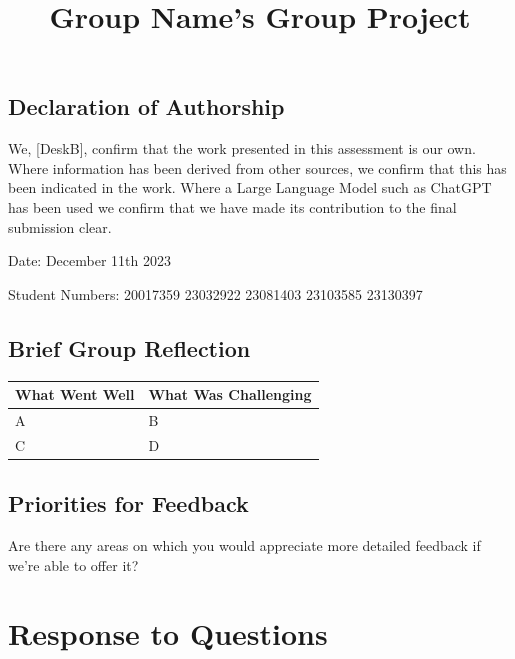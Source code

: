 \documentclass[
  a4paper,
  DIV=11,
  numbers=noendperiod]{scrartcl}
\title{Group Name's Group Project}
\author{}
\date{}
\begin{document}
\maketitle
\ifdefined\Shaded\renewenvironment{Shaded}{\begin{tcolorbox}[frame hidden, interior hidden, borderline west={3pt}{0pt}{shadecolor}, boxrule=0pt, enhanced, breakable, sharp corners]}{\end{tcolorbox}}\fi

\hypertarget{declaration-of-authorship}{%
\subsection*{Declaration of
Authorship}\label{declaration-of-authorship}}

We, {[}DeskB{]}, confirm that the work presented in this assessment is
our own. Where information has been derived from other sources, we
confirm that this has been indicated in the work. Where a Large Language
Model such as ChatGPT has been used we confirm that we have made its
contribution to the final submission clear.

Date: December 11th 2023

Student Numbers: 20017359 23032922 23081403 23103585 23130397

\hypertarget{brief-group-reflection}{%
\subsection{Brief Group Reflection}\label{brief-group-reflection}}

\begin{longtable}[]{@{}ll@{}}
\toprule\noalign{}
What Went Well & What Was Challenging \\
\midrule\noalign{}
\endhead
\bottomrule\noalign{}
\endlastfoot
A & B \\
C & D \\
\end{longtable}

\hypertarget{priorities-for-feedback}{%
\subsection{Priorities for Feedback}\label{priorities-for-feedback}}

Are there any areas on which you would appreciate more detailed feedback
if we're able to offer it?

\newpage{}

\hypertarget{response-to-questions}{%
\section{Response to Questions}\label{response-to-questions}}
\end{document}

